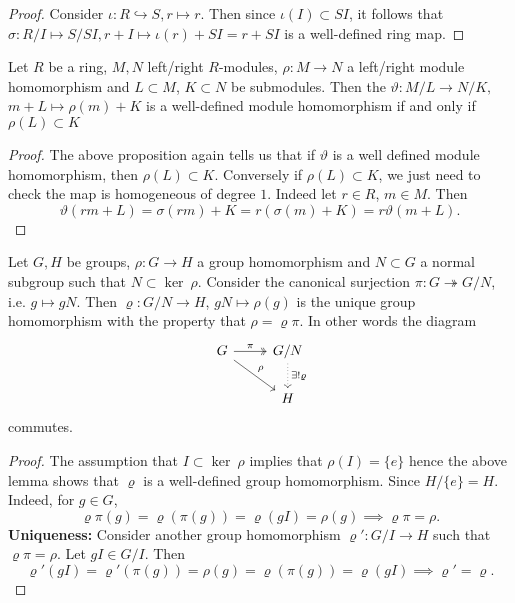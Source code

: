 \begin{proof}
    Consider $\iota : R \hookrightarrow S, r\mapsto r$. Then since $\iota(I)\subset SI$, it follows that $\sigma : R/I \mapsto S/SI, r + I \mapsto \iota(r)+SI=r+SI$ is a well-defined ring map.
\end{proof}
\begin{corollary}\label{WellDefinedQuotientModuleHomFromModuleHom}
    Let $R$ be a ring, $M,N$ left/right $R$-modules, $\rho : M \rightarrow N$ a left/right module homomorphism and $L\subset M$, $K\subset N$ be submodules. Then the $\vartheta : M/L \rightarrow N/K,$ $m+L \mapsto \rho(m)+K$ is a well-defined module homomorphism if and only if $\rho(L)\subset K$
\end{corollary}
\begin{proof}
    The above proposition again tells us that if $\vartheta$ is a well defined module homomorphism, then $\rho(L)\subset K$. Conversely if $\rho(L)\subset K$, we just need to check the map is homogeneous of degree $1$. Indeed let $r\in R$, $m\in M$. Then 
    $$\vartheta(rm + L) =  \sigma(rm)+ K = r(\sigma(m)+K)=r\vartheta(m+L).$$
\end{proof}
\begin{proposition}\label{UniqueMapQuotientGroupMap}
    Let $G,H$ be groups, $\rho : G \rightarrow H$ a group homomorphism and $N \subset G$ a normal subgroup such that $N\subset \ker \ \rho$. Consider the canonical surjection $\pi : G \twoheadrightarrow G/N$, i.e. $g \mapsto gN$. Then $\varrho : G/N \rightarrow H$, $gN \mapsto \rho(g)$ is the unique group homomorphism with the property that 
    $\rho= \varrho \pi.$ In other words the diagram 
     $$
            \begin{tikzcd}
                G \arrow[rd, "\rho"] \arrow[r, "\pi", twoheadrightarrow] & G/N \arrow[d, "\exists! \varrho", dotted] \\
                & H
            \end{tikzcd}
    $$
    commutes.
\end{proposition}
\begin{proof}
    The assumption that $I\subset \ker \ \rho$ implies that $ \rho(I) = \{e\}$ hence the above lemma shows that $\varrho$ is a well-defined group homomorphism. Since $H/\{e\} = H$. Indeed, for $g\in G$,
    $$\varrho \pi (g) = \varrho(\pi(g))= \varrho(gI)=\rho(g) \implies \varrho\pi = \rho.$$
    \textbf{Uniqueness:} Consider another group homomorphism $\varrho': G/I \rightarrow H$ such that $\varrho \pi = \rho$. Let $gI \in G/I$. Then 
    $$\varrho'(gI) = \varrho'(\pi(g))=\rho(g) = \varrho(\pi(g))=\varrho(gI)\implies \varrho' = \varrho.$$
\end{proof}
